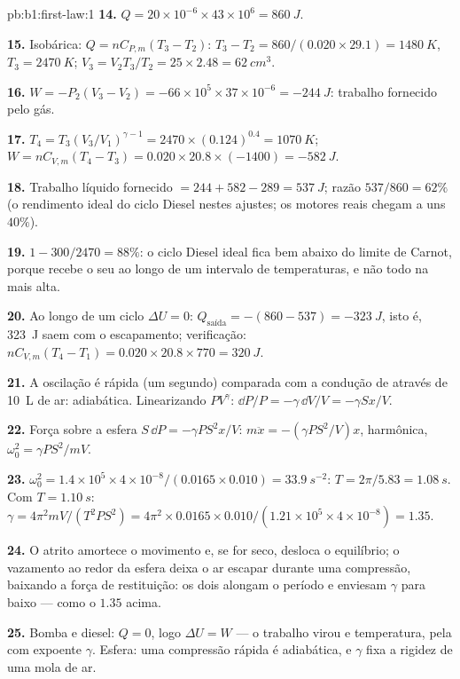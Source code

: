 \begin{solution}{pb:b1:first-law:1}
\textbf{14.} $Q = 20\times10^{-6} \times 43\times10^6 = \qty{860}{J}$.

\textbf{15.} Isobárica: $Q = nC_{P,m}(T_3 - T_2)$: $T_3 - T_2 = 860/(0.020 \times
29.1) = \qty{1480}{K}$, $T_3 = \qty{2470}{K}$; $V_3 = V_2T_3/T_2 = 25 \times
2.48 = \qty{62}{cm^3}$.

\textbf{16.} $W = -P_2(V_3 - V_2) = -66\times10^5 \times 37\times10^{-6} =
\qty{-244}{J}$: trabalho fornecido pelo gás.

\textbf{17.} $T_4 = T_3(V_3/V_1)^{\gamma - 1} = 2470 \times (0.124)^{0.4} =
\qty{1070}{K}$; $W = nC_{V,m}(T_4 - T_3) = 0.020 \times 20.8 \times (-1400) =
\qty{-582}{J}$.

\textbf{18.} Trabalho líquido fornecido $= 244 + 582 - 289 = \qty{537}{J}$; razão
$537/860 = 62\%$ (o rendimento ideal do ciclo Diesel nestes ajustes; os
motores reais chegam a uns $40\%$).

\textbf{19.} $1 - 300/2470 = 88\%$: o ciclo Diesel ideal fica bem abaixo do
limite de Carnot, porque recebe o seu  ao longo de um intervalo de
temperaturas, e não todo na mais alta.

\textbf{20.} Ao longo de um ciclo $\Delta U = 0$: $Q_{\text{saída}} = -(860 - 537) =
\qty{-323}{J}$, isto é, \qty{323}{J} saem com o escapamento; verificação:
$nC_{V,m}(T_4 - T_1) = 0.020 \times 20.8 \times 770 = \qty{320}{J}$.

\textbf{21.} A oscilação é rápida (um segundo) comparada com a condução de
 através de \qty{10}{L} de ar: adiabática. Linearizando
$PV^\gamma$: $\dd P/P = -\gamma\,\dd V/V = -\gamma Sx/V$.

\textbf{22.} Força sobre a esfera $S\,\dd P = -\gamma PS^2x/V$: $m\ddot x =
-(\gamma PS^2/V)x$, harmônica, $\omega_0^2 = \gamma PS^2/mV$.

\textbf{23.} $\omega_0^2 = 1.4 \times 10^5 \times 4\times10^{-8}/(0.0165 \times 0.010)
= \qty{33.9}{s^{-2}}$: $T = 2\pi/5.83 = \qty{1.08}{s}$. Com $T = \qty{1.10}{s}$:
$\gamma = 4\pi^2mV/(T^2PS^2) = 4\pi^2 \times 0.0165 \times 0.010/(1.21 \times 10^5
\times 4\times10^{-8}) = 1.35$.

\textbf{24.} O atrito amortece o movimento e, se for seco, desloca o
equilíbrio; o vazamento ao redor da esfera deixa o ar escapar durante uma
compressão, baixando a força de restituição: os dois alongam o período e
enviesam $\gamma$ para baixo --- como o $1.35$ acima.

\textbf{25.} Bomba e diesel: $Q = 0$, logo $\Delta U = W$ --- o trabalho virou
 e temperatura, pela  com expoente
$\gamma$. Esfera: uma compressão rápida é adiabática, e $\gamma$ fixa a
rigidez de uma mola de ar.
\end{solution}
